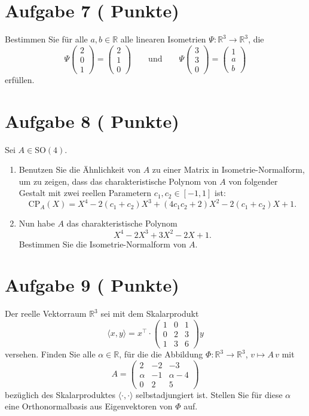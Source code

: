\documentclass[11pt, a4paper]{article}
\newcommand{\aufgabe}[2]{%
  \section*{\Large\bfseries Aufgabe #1%
  \if\relax\detokenize{#2}\relax\else \hfill\normalfont\normalsize(#2 Punkte)\fi}%
  \vspace{-1.5ex}
}
\begin{document}
\aufgabe{7}{}
Bestimmen Sie für alle $a,b\in\mathbb{R}$ alle linearen Isometrien $\Psi:\mathbb{R}^3\to\mathbb{R}^3$, die
\[
\Psi\!\begin{pmatrix}2\\0\\1\end{pmatrix}=\begin{pmatrix}2\\1\\0\end{pmatrix}
\qquad\text{und}\qquad
\Psi\!\begin{pmatrix}3\\3\\0\end{pmatrix}=\begin{pmatrix}1\\ a\\ b\end{pmatrix}
\]
erfüllen.
\begin{framed}\end{framed}

\aufgabe{8}{}
Sei $A\in \mathrm{SO}(4)$.
\begin{enumerate}
  \item Benutzen Sie die Ähnlichkeit von $A$ zu einer Matrix in Isometrie-Normalform, um zu zeigen, dass das charakteristische Polynom von $A$ von folgender Gestalt mit zwei reellen Parametern $c_1,c_2\in[-1,1]$ ist:
  \[
    \mathrm{CP}_A(X)=X^4-2(c_1+c_2)X^3+(4c_1c_2+2)X^2-2(c_1+c_2)X+1.
  \]
  \begin{framed}\end{framed}

  \item Nun habe $A$ das charakteristische Polynom
  \[
    X^4-2X^3+3X^2-2X+1.
  \]
  Bestimmen Sie die Isometrie-Normalform von $A$.
  \begin{framed}\end{framed}
\end{enumerate}

\aufgabe{9}{}
Der reelle Vektorraum $\mathbb{R}^3$ sei mit dem Skalarprodukt
\[
\langle x,y\rangle = x^\top\!\cdot
\begin{pmatrix}
1 & 0 & 1\\
0 & 2 & 3\\
1 & 3 & 6
\end{pmatrix} y
\]
versehen. Finden Sie alle $\alpha\in\mathbb{R}$, für die die Abbildung $\Phi:\mathbb{R}^3\to\mathbb{R}^3$, $v\mapsto A\,v$ mit
\[
A=
\begin{pmatrix}
2 & -2 & -3\\
\alpha & -1 & \alpha-4\\
0 & 2 & 5
\end{pmatrix}
\]
bezüglich des Skalarproduktes $\langle\cdot,\cdot\rangle$ selbstadjungiert ist. Stellen Sie für diese $\alpha$ eine Orthonormalbasis aus Eigenvektoren von $\Phi$ auf.
\begin{framed}\end{framed}
\end{document}

